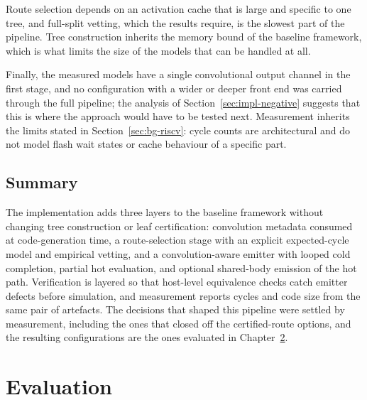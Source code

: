 Route selection depends on an activation cache that is large and specific to one tree, and full-split vetting, which the results require, is the slowest part of the pipeline.
Tree construction inherits the memory bound of the baseline framework, which is what limits the size of the models that can be handled at all.

Finally, the measured models have a single convolutional output channel in the first stage, and no configuration with a wider or deeper front end was carried through the full pipeline; the analysis of Section~\ref{sec:impl-negative} suggests that this is where the approach would have to be tested next.
Measurement inherits the limits stated in Section~\ref{sec:bg-riscv}: cycle counts are architectural and do not model flash wait states or cache behaviour of a specific part.


\section{Summary}
\label{sec:impl-summary}

The implementation adds three layers to the baseline framework without changing tree construction or leaf certification: convolution metadata consumed at code-generation time, a route-selection stage with an explicit expected-cycle model and empirical vetting, and a convolution-aware emitter with looped cold completion, partial hot evaluation, and optional shared-body emission of the hot path.
Verification is layered so that host-level equivalence checks catch emitter defects before simulation, and measurement reports cycles and code size from the same pair of artefacts.
The decisions that shaped this pipeline were settled by measurement, including the ones that closed off the certified-route options, and the resulting configurations are the ones evaluated in Chapter~\ref{ch:evaluation}.

\chapter{Evaluation}
\label{ch:evaluation}
